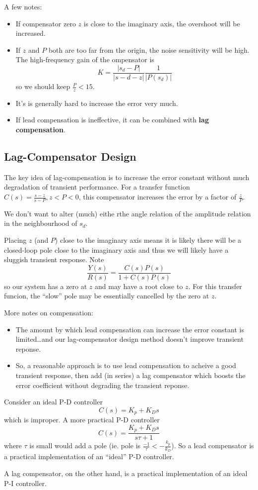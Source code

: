 \documentclass[12pt]{article}
\begin{document}
A few notes:
\begin{itemize}
\item If compensator zero $z$ is close to the imaginary axis, the overshoot will be increased.
\item If $z$ and $P$ both are too far from the origin, the noise sensitivity will be high. The high-frequency gain of the ompensator is \[ K = \frac{|s_d - P|}{|s-d - z|} \frac{1}{|P(s_d)|} \] so we should keep $\frac{P}{z} < 15$.
\item It's is generally hard to increase the error very much.
\item If lead compensation is ineffective, it can be combined with {\bf lag compensation}.
\end{itemize}

\subsection{Lag-Compensator Design}
The key idea of lag-compensation is to increase the error constant without much degradation of transient performance. For a transfer function $C(s) = \frac{s-z}{s-P}, z < P < 0$, this compensator increases the error by a factor of $\frac{z}{P}$.

We don't want to alter (much) eithe rthe angle relation of the amplitude relation in the neighbourhood of $s_d$.

Placing $z$ (and $P$) close to the imaginary axis means it is likely there will be a closed-loop pole close to the imaginary axis and thus we will likely have a sluggish transient response. Note \[ \frac{Y(s)}{R(s)} = \frac{C(s)P(s)}{1 + C(s)P(s)} \] so our system has a zero at $z$ and may have a root close to $z$. For this transfer funcion, the ``slow'' pole may be essentially cancelled by the zero at $z$.

More notes on compensation:
\begin{itemize}
\item The amount by which lead compensation can increase the error constant is limited\dots and our lag-compensator design method doesn't improve transient reponse.
\item So, a reasonable approach is to use lead compensation to acheive a good transient response, then add (in series) a lag compensator which boosts the error coefficient without degrading the transient reponse.
\end{itemize}

Consider an ideal P-D controller \[ C(s) = K_p + K_Ds \] which is improper. A more practical P-D controller \[ C(s) = \frac{K_p + K_Ds}{s\tau + 1} \] where $\tau$ is small would add a pole (ie. pole is $\frac{-1}{\tau} < -\frac{k_p}{k_D}$). So a lead compensator is a practical implementation of an ``ideal'' P-D controller.

A lag compensator, on the other hand, is a practical implementation of an ideal P-I controller.
\end{document}
